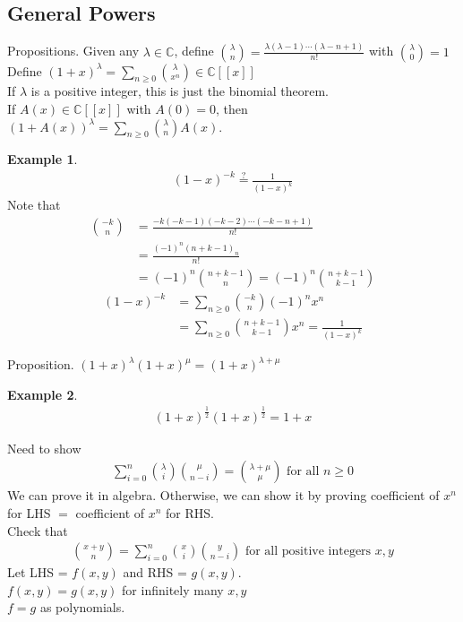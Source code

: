 \documentclass{article}
\theoremstyle{definition}
\newtheorem{ex}{Example}[]
\newenvironment{pf*}{\pushQED{\qed}\pf}{\popQED\endpf}
\begin{document}
\subsection{General Powers}
Propositions. Given any $\lambda \in \mathbb{C}$, define 
${\lambda \choose n} = \frac{\lambda(\lambda-1)\cdots(\lambda-n+1)}{n!}$ with ${\lambda \choose 0} = 1$ \\ 
Define $(1+x)^{\lambda} = \sum_{n\ge 0} {\lambda \choose x^n} \in \mathbb{C}[[x]]$ \\ 
If $\lambda$ is a positive integer, this is just the binomial theorem. \\ 
If $A(x) \in \mathbb{C}[[x]]$ with $A(0) = 0$,
then $(1+ A(x))^\lambda = \sum_{n\ge 0} {\lambda \choose n} A(x)$.
\begin{ex}
    \begin{align*}
        (1-x)^{-k} \overset{?}{=} \frac{1}{(1-x)^k}
    \end{align*}
    Note that 
    \begin{align*}
        {-k \choose n} &= \frac{-k (-k -1)(-k -2 ) \cdots (-k-n+1)}{n!}\\ 
        &= \frac{(-1)^n (n+k-1)_n }{n!} \\ 
        &= (-1)^n {n + k - 1 \choose n} = (-1)^n { n+ k - 1\choose k - 1}
    \end{align*} 
    \begin{align*}
        (1-x)^{-k} &= \sum_{n\ge 0} {-k \choose n} (-1)^n x^n \\ 
        &= \sum_{n \ge 0} {n+k -1 \choose k -1} x^n = \frac{1}{(1-x)^k}
    \end{align*}
\end{ex}
Proposition. $(1+x)^\lambda (1+x)^\mu = (1+x)^{\lambda + \mu}$
\begin{ex}
    \begin{align*}
        (1+x)^{\frac{1}{2}} ( 1+ x)^{\frac{1}{2}} = 1 + x
    \end{align*}
\end{ex}
\begin{pf*}
    Need to show 
    \begin{align*}
        \sum_{i=0}^n {\lambda \choose i} {\mu \choose n-i} = 
        {\lambda + \mu \choose \mu} \text{ for all } n \ge 0 
    \end{align*}
    We can prove it in algebra. 
    Otherwise, we can show it by proving coefficient of $x^n$ for LHS $=$ 
    coefficient of $x^n$ for RHS.\\ 
    Check that 
    \begin{align*}
        {x+y \choose n} = \sum_{i=0}^n { x \choose i}{y \choose n - i}
        \text{ for all positive integers } x, y
    \end{align*}
    Let LHS = $f(x, y)$ and RHS = $g(x,y)$. \\ 
    $f(x, y) = g(x, y)$ for infinitely many $x, y$ \\ 
    $f=g$ as polynomials.
\end{pf*} 
\end{document}

